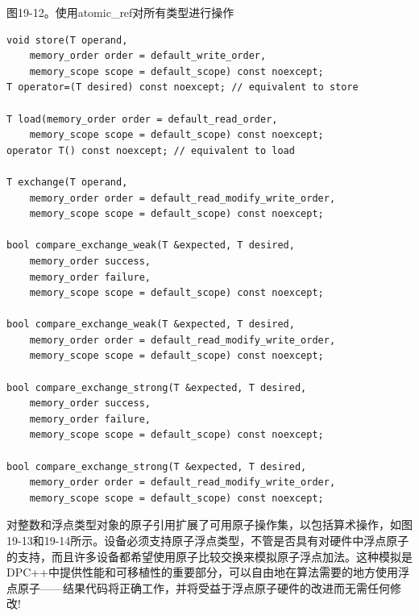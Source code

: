 \hspace*{\fill} \par %
图19-12。使用atomic\_ref对所有类型进行操作
\begin{lstlisting}[caption={}]
void store(T operand,
	memory_order order = default_write_order,
	memory_scope scope = default_scope) const noexcept;
T operator=(T desired) const noexcept; // equivalent to store

T load(memory_order order = default_read_order,
	memory_scope scope = default_scope) const noexcept;
operator T() const noexcept; // equivalent to load

T exchange(T operand,
	memory_order order = default_read_modify_write_order,
	memory_scope scope = default_scope) const noexcept;
	
bool compare_exchange_weak(T &expected, T desired,
	memory_order success,
	memory_order failure,
	memory_scope scope = default_scope) const noexcept;
	
bool compare_exchange_weak(T &expected, T desired,
	memory_order order = default_read_modify_write_order,
	memory_scope scope = default_scope) const noexcept;
	
bool compare_exchange_strong(T &expected, T desired,
	memory_order success,
	memory_order failure,
	memory_scope scope = default_scope) const noexcept;
	
bool compare_exchange_strong(T &expected, T desired,
	memory_order order = default_read_modify_write_order,
	memory_scope scope = default_scope) const noexcept;
\end{lstlisting}

对整数和浮点类型对象的原子引用扩展了可用原子操作集，以包括算术操作，如图19-13和19-14所示。设备必须支持原子浮点类型，不管是否具有对硬件中浮点原子的支持，而且许多设备都希望使用原子比较交换来模拟原子浮点加法。这种模拟是DPC++中提供性能和可移植性的重要部分，可以自由地在算法需要的地方使用浮点原子——结果代码将正确工作，并将受益于浮点原子硬件的改进而无需任何修改!\par

